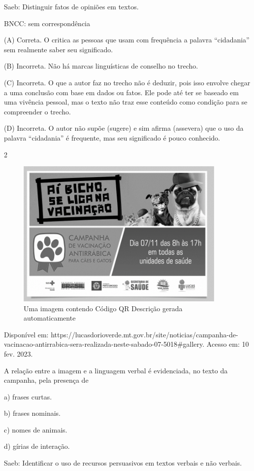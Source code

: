 Saeb: Distinguir fatos de opiniões em textos.

BNCC: sem correspondência

(A) Correta. O critica as pessoas que usam com frequência a palavra
``cidadania'' sem realmente saber seu significado.

(B) Incorreta. Não há marcas linguísticas de conselho no trecho.

(C) Incorreta. O que a autor faz no trecho não é deduzir, pois isso
envolve chegar a uma conclusão com base em dados ou fatos. Ele pode até
ter se baseado em uma vivência pessoal, mas o texto não traz esse
conteúdo como condição para se compreender o trecho.

(D) Incorreta. O autor não supõe (sugere) e sim afirma (assevera) que o
uso da palavra ``cidadania'' é frequente, mas seu significado é pouco
conhecido.

\num{2}

\begin{figure}
\centering
\includegraphics[width=4.03125in,height=2.85231in]{./imgSAEB_8_POR/media/image28.png}
\caption{Uma imagem contendo Código QR Descrição gerada automaticamente}
\end{figure}

Disponível em:
https://lucasdorioverde.mt.gov.br/site/noticias/campanha-de-vacinacao-antirrabica-sera-realizada-neste-sabado-07-5018\#gallery.
Acesso em: 10 fev. 2023.

A relação entre a imagem e a linguagem verbal é evidenciada, no texto da
campanha, pela presença de

a) frases curtas.

b) frases nominais.

c) nomes de animais.

d) gírias de interação.

Saeb: Identificar o uso de recursos persuasivos em textos verbais e não
verbais.


